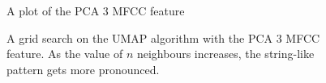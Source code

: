 \documentclass[a4paper, 12pt, twoside]{report}
\begin{document}
\begin{figure}[h!b]
\centering
{}
\caption{\label{fig:3d_pca}A plot of the PCA 3 MFCC feature}
\end{figure}

\begin{figure}[h!tbp]
\centering
{}
\caption{A grid search on the UMAP algorithm with the PCA 3 MFCC feature. As the value of $n$ neighbours increases, the string-like pattern gets more pronounced.}
\label{fig:umap_3d_pca_grid_search}
\end{figure}
\end{document}
